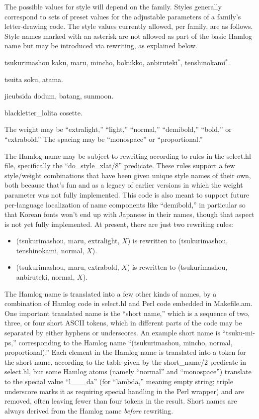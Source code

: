 \documentclass[14pt]{extarticle}
\begin{document}
The possible values for style will depend on the family.  Styles generally
correspond to sets of preset values for the adjustable parameters of a
family's letter-drawing code.  The style values currently allowed, per
family, are as follows.  Style names marked with an asterisk are not allowed
as part of the basic Hamlog name but may be introduced via rewriting, as
explained below.
\begin{description}
  \item{\anbiruteki tsukurimashou} kaku, maru, mincho, bokukko,
    anbiruteki$^*$, tenshinokami$^*$.
  \item{\anbiruteki tsuita} soku, atama.
  \item{\anbiruteki jieubsida} dodum, batang, sunmoon.
  \item{\anbiruteki blackletter\_lolita} cosette.
\end{description}

The weight may be ``extralight,'' ``light,'' ``normal,'' ``demibold,''
``bold,'' or ``extrabold.''  The spacing may be ``monospace'' or
``proportional.''

The Hamlog name may be subject to rewriting according to rules in the
select.hl file, specifically the ``do\_style\_xlat/8'' predicate.  These
rules support a few style/weight combinations that have been given unique
style names of their own, both because that's fun and as a legacy of earlier
versions in which the weight parameter was not fully implemented.  This code
is also meant to support future per-language localization of name components
like ``demibold,'' in particular so that Korean fonts won't end up with
Japanese in their names, though that aspect is not yet fully implemented.
At present, there are just two rewriting rules:
\begin{itemize}
  \item (tsukurimashou, maru, extralight, $X$) is rewritten to
    (tsukurimashou, tenshinokami, normal, $X$).
  \item (tsukurimashou, maru, extrabold, $X$) is rewritten to
    (tsukurimashou, anbiruteki, normal, $X$).
\end{itemize}

The Hamlog name is translated into a few other kinds of names, by a
combination of Hamlog code in select.hl and Perl code embedded in
Makefile.am.  One important translated name is the ``short name,'' which is
a sequence of two, three, or four short ASCII tokens, which in different
parts of the code may be separated by either hyphens or underscores.  An
example short name is ``tsuku-mi-ps,'' corresponding to the Hamlog name
``(tsukurimashou, mincho, normal, proportional).'' Each element in the
Hamlog name is translated into a token for the short name, according to the
table given by the short\_name/2 predicate in select.hl, but some Hamlog
atoms (namely ``normal'' and ``monospace'') translate to the special value
``l\_\_\_da'' (for ``lambda,'' meaning empty string; triple underscore marks
it as requiring special handling in the Perl wrapper) and are removed,
often leaving fewer than four tokens in the result.  Short names are always
derived from the Hamlog name \emph{before} rewriting.
\end{document}
